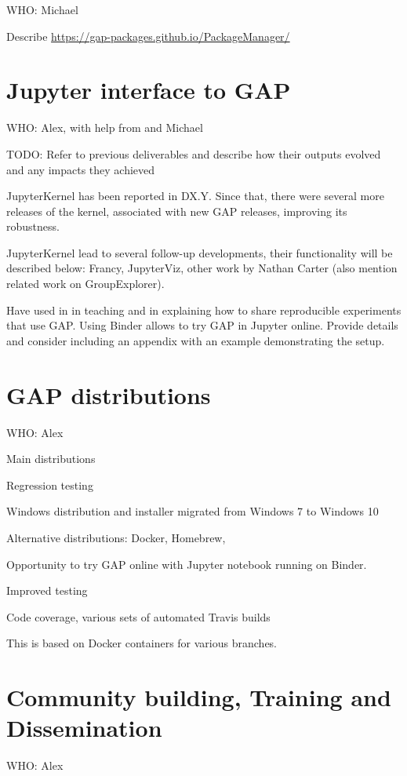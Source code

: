 \documentclass{deliverablereport}
\begin{document}
WHO: Michael

Describe \url{https://gap-packages.github.io/PackageManager/}


\section{Jupyter interface to GAP}

WHO: Alex, with help from and Michael

TODO: Refer to previous deliverables and describe how their outputs
evolved and any impacts they achieved

JupyterKernel has been reported in DX.Y. Since that, there were
several more releases of the kernel, associated with new GAP
releases, improving its robustness. 

JupyterKernel lead to several follow-up developments, their
functionality will be described below: Francy, JupyterViz,
other work by Nathan Carter (also mention related work on
GroupExplorer).

Have used in in teaching and in explaining how to share 
reproducible experiments that use GAP. Using Binder
allows to try GAP in Jupyter online. Provide details
and consider including an appendix with an example 
demonstrating the setup.

\section{GAP distributions}

WHO: Alex

Main distributions

Regression testing

Windows distribution and installer migrated from Windows 7 to Windows 10

Alternative distributions: Docker, Homebrew, 

Opportunity to try GAP online with Jupyter notebook running on Binder.

Improved testing

Code coverage, various sets of automated Travis builds

This is based on Docker containers for various branches.

\section{Community building, Training and Dissemination}

WHO: Alex
\end{document}
